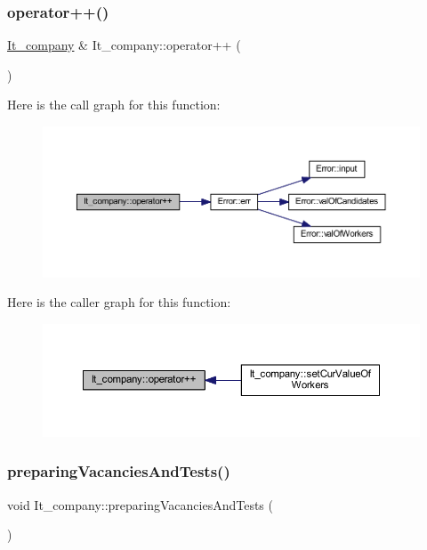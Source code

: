 \subsubsection{\texorpdfstring{operator++()}{operator++()}}
{\footnotesize\ttfamily \hyperlink{class_it__company}{It\+\_\+company} \& It\+\_\+company\+::operator++ (\begin{DoxyParamCaption}{ }\end{DoxyParamCaption})}

Here is the call graph for this function\+:
\nopagebreak
\begin{figure}[H]
\begin{center}
\leavevmode
\includegraphics[width=350pt]{class_it__company_ae83add85a00be1e24cdce48aa72678de_cgraph}
\end{center}
\end{figure}
Here is the caller graph for this function\+:
\nopagebreak
\begin{figure}[H]
\begin{center}
\leavevmode
\includegraphics[width=350pt]{class_it__company_ae83add85a00be1e24cdce48aa72678de_icgraph}
\end{center}
\end{figure}
\hypertarget{class_it__company_ab5f464351646bc6458640391f5eab298}{}\label{class_it__company_ab5f464351646bc6458640391f5eab298} 
\subsubsection{\texorpdfstring{preparing\+Vacancies\+And\+Tests()}{preparingVacanciesAndTests()}}
{\footnotesize\ttfamily void It\+\_\+company\+::preparing\+Vacancies\+And\+Tests (\begin{DoxyParamCaption}{ }\end{DoxyParamCaption})\hspace{0.3cm}{\ttfamily [private]}}

